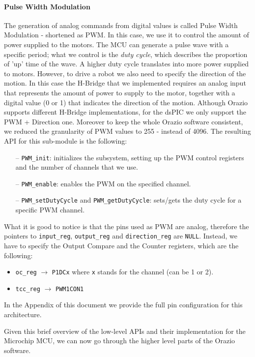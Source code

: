 \documentclass[10pt,a4paper, notitlepage]{report}
\begin{document}
\paragraph{Pulse Width Modulation} The generation of analog commands from digital values is called Pulse Width Modulation - shortened as PWM. In this case, we use it to control the amount of power supplied to the motors. The MCU can generate a pulse wave with a specific period; what we control is the \textit{duty cycle}, which describes the proportion of 'up' time of the wave. A higher duty cycle translates into more power supplied to motors. 
However, to drive a robot we also need to specify the direction of the motion. In this case the H-Bridge that we implemented requires an analog input that represents the amount of power to supply to the motor, together with a digital value (0 or 1) that indicates the direction of the motion. 
Although Orazio supports different H-Bridge implementations, for the dsPIC we only support the PWM + Direction one. Moreover to keep the whole Orazio software consistent, we reduced the granularity of PWM values to 255 - instead of 4096.
The resulting API for this sub-module is the following:
\begin{itemize}
  \item[--] \texttt{PWM\_init}: initializes the subsystem, setting up the PWM control registers and the number of channels that we use.
  \item[--] \texttt{PWM\_enable}: enables the PWM on the specified channel.
  \item[--] \texttt{PWM\_setDutyCycle} and \texttt{PWM\_getDutyCycle}: sets/gets the duty cycle for a specific PWM channel.
\end{itemize}
What it is good to notice is that the pins used as PWM are analog, therefore the pointers to \texttt{input\_reg}, \texttt{output\_reg} and \texttt{direction\_reg} are \texttt{NULL}. Instead, we have to specify the Output Compare and the Counter registers, which are the following:
\begin{itemize}
  \item \texttt{oc\_reg} $\rightarrow$ \texttt{P1DCx} where \texttt{x} stands for the channel (can be 1 or 2).
  \item \texttt{tcc\_reg} $\rightarrow$ \texttt{PWM1CON1}
\end{itemize}
In the Appendix of this document we provide the full pin configuration for this architecture.

\vspace{10px}
Given this brief overview of the low-level APIs and their implementation for the Microchip MCU, we can now go through the higher level parts of the Orazio software.
\end{document}
